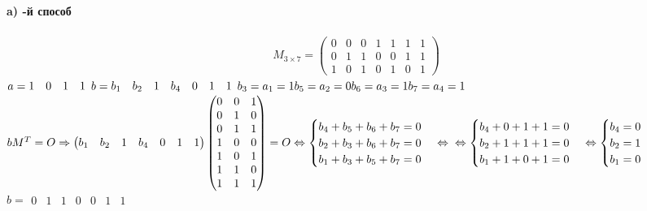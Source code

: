 \documentclass[a4paper, 12pt]{article}
\newcommand{\RNum}[1]{\uppercase\expandafter{\romannumeral #1\relax}}
\begin{document}
\paragraph*{a) \RNum{1}-й способ}
\begin{align*}
      M_{3\times7} = \begin{pmatrix}
          0 & 0 & 0 & 1 & 1 & 1 & 1\\
          0 & 1 & 1 & 0 & 0 & 1 & 1\\
          1 & 0 & 1 & 0 & 1 & 0 & 1
      \end{pmatrix}
\end{align*}
$ a = \begin{matrix}
    1 & 0 & 1 & 1
\end{matrix} \\ 
b =\begin{matrix}
    b_1 & b_2 & 1 & b_4 & 0 &1 &1 
\end{matrix} \\
b_3 = a_1 = 1 \\
b_5 = a_2 = 0 \\ 
b_6 = a_3 = 1 \\ 
b_7 = a_4 = 1$
\\
$ bM^T = O \Rightarrow \begin{pmatrix}
    b_1 & b_2 & 1 & b_4 & 0 & 1 & 1
\end{pmatrix} \begin{pmatrix}
    0 & 0 & 1 \\
    0 & 1 & 0 \\
    0 & 1 & 1 \\
    1 & 0 & 0 \\
    1 & 0 & 1 \\
    1 & 1 & 0 \\
    1 & 1 & 1
\end{pmatrix} = O \Leftrightarrow \begin{cases}
    b_4 + b_5 + b_6 + b_7 = 0 \\
    b_2 + b_3 + b_6 + b_7 = 0 \\
    b_1 + b_3 + b_5 + b_7 = 0
\end{cases} \Leftrightarrow \\ \Leftrightarrow \begin{cases}
    b_4 + 0 + 1 + 1 = 0 \\
    b_2 + 1 + 1 + 1 = 0 \\
    b_1 + 1 + 0 + 1 = 0
\end{cases} \Leftrightarrow \begin{cases}
    b_4 = 0 \\ 
    b_2 = 1 \\ 
    b_1 = 0
\end{cases}$ \\
$ b = \begin{matrix}
    0 & 1 & 1 & 0 & 0 & 1 & 1
\end{matrix}$ \\
\end{document}
